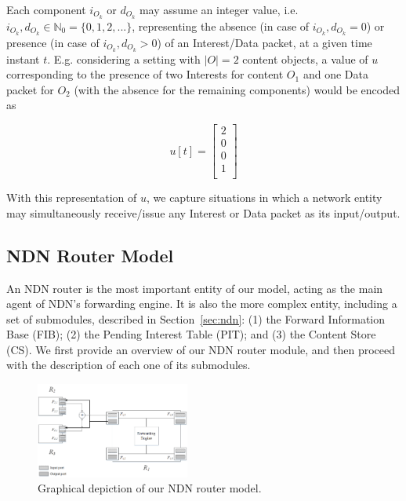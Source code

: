 Each component $i_{O_k}$ or $d_{O_k}$ may assume an integer value, i.e. $i_{O_k}, d_{O_k} \in \mathbb{N}_0 = \{0, 1, 2, ... \}$, 
representing the absence (in case of $i_{O_k}, d_{O_k} = 0$) or presence (in case of $i_{O_k}, d_{O_k} > 0$) of an 
Interest\slash Data packet, at a given time instant $t$. E.g. considering a setting 
with $|O| = 2$ content objects, a value of $u$ corresponding to the presence 
of two Interests for content $O_1$ and one Data packet for $O_2$ (with the absence 
for the remaining components) would be encoded as

\begin{equation}
    u[t] = \begin{bmatrix}     2   \\ 
                                        0   \\ 
                                        0   \\ 
                                        1   \\ \end{bmatrix}
    \label{eq:signal-eg}
\end{equation}\shortvertbreak

With this 
representation of $u$, we capture situations in which a network 
entity may simultaneously receive\slash issue any Interest or Data packet as 
its input\slash output.

\subsection{NDN Router Model}
\label{subsec:meth-overview}

An NDN router is the most important entity of our model, acting 
as the main agent of NDN's forwarding engine. It is also the more complex entity, 
including a set of submodules, 
described in Section~\ref{sec:ndn}: (1) the Forward Information Base (FIB); (2) 
the Pending Interest Table (PIT); and (3) the Content Store (CS). We first 
provide an overview of our NDN router module, and then proceed with the description 
of each one of its submodules.\shortvertbreak

\begin{figure}[h!]

    \centering
    \includegraphics[width=0.45\textwidth]{figures/ndn-router-overview.png}
    \cprotect\caption{Graphical depiction of our NDN router model.}
    \label{fig:ndn-router-overview}

\end{figure}

